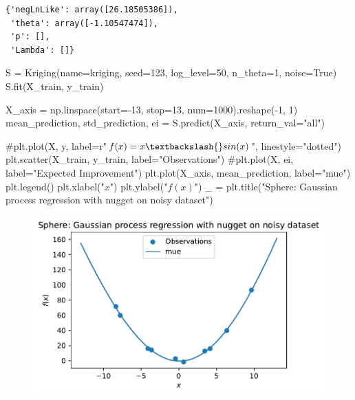 \documentclass[
  letterpaper,
  DIV=11,
  numbers=noendperiod]{scrreprt}
\newenvironment{Shaded}{\begin{snugshade}}{\end{snugshade}}
\newcommand{\CommentTok}[1]{\textcolor[rgb]{0.37,0.37,0.37}{#1}}
\newcommand{\DecValTok}[1]{\textcolor[rgb]{0.68,0.00,0.00}{#1}}
\newcommand{\NormalTok}[1]{\textcolor[rgb]{0.00,0.23,0.31}{#1}}
\newcommand{\OperatorTok}[1]{\textcolor[rgb]{0.37,0.37,0.37}{#1}}
\newcommand{\StringTok}[1]{\textcolor[rgb]{0.13,0.47,0.30}{#1}}
\newcommand{\VariableTok}[1]{\textcolor[rgb]{0.07,0.07,0.07}{#1}}
\begin{document}
\begin{verbatim}
{'negLnLike': array([26.18505386]),
 'theta': array([-1.10547474]),
 'p': [],
 'Lambda': []}
\end{verbatim}

\begin{Shaded}
\begin{Highlighting}[]
\NormalTok{S }\OperatorTok{=}\NormalTok{ Kriging(name}\OperatorTok{=}\StringTok{\textquotesingle{}kriging\textquotesingle{}}\NormalTok{,}
\NormalTok{            seed}\OperatorTok{=}\DecValTok{123}\NormalTok{,}
\NormalTok{            log\_level}\OperatorTok{=}\DecValTok{50}\NormalTok{,}
\NormalTok{            n\_theta}\OperatorTok{=}\DecValTok{1}\NormalTok{,}
\NormalTok{            noise}\OperatorTok{=}\VariableTok{True}\NormalTok{)}
\NormalTok{S.fit(X\_train, y\_train)}

\NormalTok{X\_axis }\OperatorTok{=}\NormalTok{ np.linspace(start}\OperatorTok{={-}}\DecValTok{13}\NormalTok{, stop}\OperatorTok{=}\DecValTok{13}\NormalTok{, num}\OperatorTok{=}\DecValTok{1000}\NormalTok{).reshape(}\OperatorTok{{-}}\DecValTok{1}\NormalTok{, }\DecValTok{1}\NormalTok{)}
\NormalTok{mean\_prediction, std\_prediction, ei }\OperatorTok{=}\NormalTok{ S.predict(X\_axis, return\_val}\OperatorTok{=}\StringTok{"all"}\NormalTok{)}

\CommentTok{\#plt.plot(X, y, label=r"$f(x) = x \textbackslash{}sin(x)$", linestyle="dotted")}
\NormalTok{plt.scatter(X\_train, y\_train, label}\OperatorTok{=}\StringTok{"Observations"}\NormalTok{)}
\CommentTok{\#plt.plot(X, ei, label="Expected Improvement")}
\NormalTok{plt.plot(X\_axis, mean\_prediction, label}\OperatorTok{=}\StringTok{"mue"}\NormalTok{)}
\NormalTok{plt.legend()}
\NormalTok{plt.xlabel(}\StringTok{"$x$"}\NormalTok{)}
\NormalTok{plt.ylabel(}\StringTok{"$f(x)$"}\NormalTok{)}
\NormalTok{\_ }\OperatorTok{=}\NormalTok{ plt.title(}\StringTok{"Sphere: Gaussian process regression with nugget on noisy dataset"}\NormalTok{)}
\end{Highlighting}
\end{Shaded}

\begin{figure}[H]

{\centering \includegraphics{012_num_spot_ei_files/figure-pdf/cell-52-output-1.pdf}

}

\end{figure}
\end{document}
